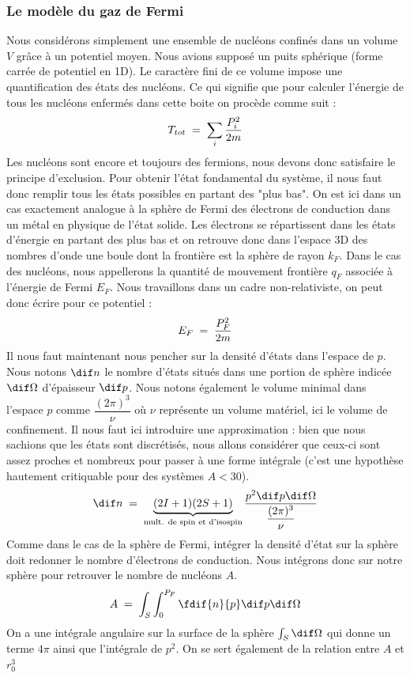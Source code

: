 \subsubsection{Le modèle du gaz de Fermi}
Nous considérons simplement une ensemble de nucléons confinés dans un volume $V$ grâce à un potentiel moyen. Nous avions supposé un puits sphérique (forme carrée de potentiel en 1D). Le caractère fini de ce volume impose une quantification des états des nucléons. Ce qui signifie que pour calculer l'énergie de tous les nucléons enfermés dans cette boite on procède comme suit :
\[
    T_{tot} \; = \; \sum_i \dfrac{P_i^2}{2m}
\]
Les nucléons sont encore et toujours des fermions, nous devons donc satisfaire le principe d'exclusion. Pour obtenir l'état fondamental du système, il nous faut donc remplir tous les états possibles en partant des "plus bas". On est ici dans un cas exactement analogue à la sphère de Fermi des électrons de conduction dans un métal en physique de l'état solide. Les électrons se répartissent dans les états d'énergie en partant des plus bas et on retrouve donc dans l'espace 3D des nombres d'onde une boule dont la frontière est la sphère de rayon $k_F$. Dans le cas des nucléons, nous appellerons la quantité de mouvement frontière $q_F$ associée à l'énergie de Fermi $E_F$. Nous travaillons dans un cadre non-relativiste, on peut donc écrire pour ce potentiel :
\[
    E_F \; = \; \dfrac{P_F^2}{2m}
\]
Il nous faut maintenant nous pencher sur la densité d'états dans l'espace de $p$. Nous notons $\dif n$ le nombre d'états situés dans une portion de sphère indicée $\dif\Omega$ d'épaisseur $\dif p$. Nous notons également le volume minimal dans l'espace $p$ comme $\dfrac{(2\pi)^3}{\nu}$ où $\nu$ représente un volume matériel, ici le volume de confinement. Il nous faut ici introduire une approximation : bien que nous sachions que les états sont discrétisés, nous allons considérer que ceux-ci sont assez proches et nombreux pour passer à une forme intégrale (c'est une hypothèse hautement critiquable pour des systèmes $A<30$).
\[
    \dif n \eq \underbrace{(2I+1)(2S+1)}_{\text{mult. de spin et d'isospin}}\dfrac{p^2\dif p \dif \Omega}{\dfrac{(2\pi)^3}{\nu}}
\]
Comme dans le cas de la sphère de Fermi, intégrer la densité d'état sur la sphère doit redonner le nombre d'électrons de conduction. Nous intégrons donc sur notre sphère pour retrouver le nombre de nucléons $A$.
\[
    A\eq \int_S\int_0^{P_F} \fdif{n}{p}\dif p \dif \Omega
\]
On a une intégrale angulaire sur la surface de la sphère $\int_S \dif\Omega$ qui donne un terme $4\pi$ ainsi que l'intégrale de $p^2$. On se sert également de la relation entre $A$ et $r_0^3$
